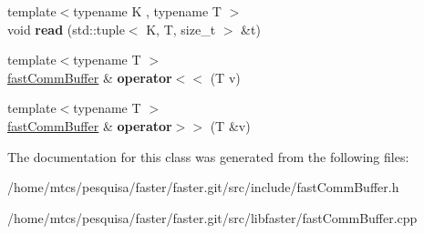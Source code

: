\begin{DoxyCompactItemize}
\hypertarget{classfaster_1_1fastCommBuffer_afe0968b6a32dbafdd87639262e21ea0f}{}\label{classfaster_1_1fastCommBuffer_afe0968b6a32dbafdd87639262e21ea0f} 
{\footnotesize template$<$typename K , typename T $>$ }\\void {\bfseries read} (std\+::tuple$<$ K, T, size\+\_\+t $>$ \&t)
\item 
\hypertarget{classfaster_1_1fastCommBuffer_a0b4e973082ad897d135a5a454a06623f}{}\label{classfaster_1_1fastCommBuffer_a0b4e973082ad897d135a5a454a06623f} 
{\footnotesize template$<$typename T $>$ }\\\hyperlink{classfaster_1_1fastCommBuffer}{fast\+Comm\+Buffer} \& {\bfseries operator$<$$<$} (T v)
\item 
\hypertarget{classfaster_1_1fastCommBuffer_a957e261de1a95762b9730a0322f5d341}{}\label{classfaster_1_1fastCommBuffer_a957e261de1a95762b9730a0322f5d341} 
{\footnotesize template$<$typename T $>$ }\\\hyperlink{classfaster_1_1fastCommBuffer}{fast\+Comm\+Buffer} \& {\bfseries operator$>$$>$} (T \&v)
\end{DoxyCompactItemize}


The documentation for this class was generated from the following files\+:\begin{DoxyCompactItemize}
\item 
/home/mtcs/pesquisa/faster/faster.\+git/src/include/fast\+Comm\+Buffer.\+h\item 
/home/mtcs/pesquisa/faster/faster.\+git/src/libfaster/fast\+Comm\+Buffer.\+cpp\end{DoxyCompactItemize}
